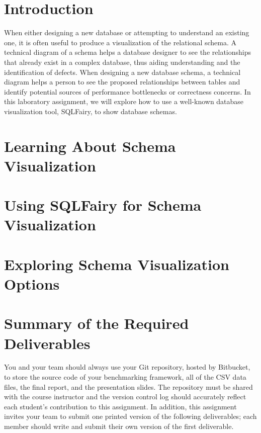 


\usepackage[compact]{titlesec}



\section*{Introduction}

When either designing a new database or attempting to understand an existing one, it is often useful to produce a
visualization of the relational schema.  A technical diagram of a schema helps a database designer to see the
relationships that already exist in a complex database, thus aiding understanding and the identification of defects.
When designing a new database schema, a technical diagram helps a person to see the proposed relationships between
tables and identify potential sources of performance bottlenecks or correctness concerns. In this laboratory assignment,
we will explore how to use a well-known database visualization tool, SQLFairy, to show database schemas.

\section*{Learning About Schema Visualization}

\section*{Using SQLFairy for Schema Visualization}

\section*{Exploring Schema Visualization Options}
\vspace*{-.2in}



\section*{Summary of the Required Deliverables}

You and your team should always use your Git repository, hosted by Bitbucket, to store the source code of your
benchmarking framework, all of the CSV data files, the final report, and the presentation slides. The repository must be
shared with the course instructor and the version control log should accurately reflect each student's contribution to
this assignment. In addition, this assignment invites your team to submit one printed version of the following
deliverables; each member should write and submit their own version of the first deliverable. 

